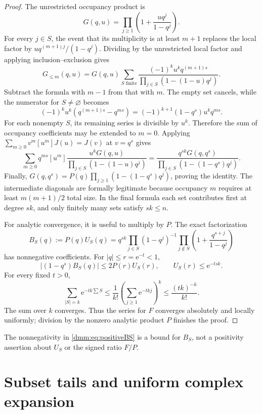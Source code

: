 \documentclass[11pt,letterpaper]{article}
\numberwithin{equation}{section}
\theoremstyle{definition}\newtheorem{definition}[theorem]{Definition}
\theoremstyle{remark}\newtheorem{remark}[theorem]{Remark}
\newcommand{\ee}{\mathrm e}
\begin{document}
\begin{proof}
The unrestricted occupancy product is
\[
G(q,u)=\prod_{j\ge1}\left(1+\frac{u q^j}{1-q^j}\right).
\]
For every $j\in S$, the event that its multiplicity is at least $m+1$ replaces the local factor by $u q^{(m+1)j}/(1-q^j)$. Dividing by the unrestricted local factor and applying inclusion--exclusion gives
\begin{equation}\label{dmm:eq:IE}
G_{\le m}(q,u)=G(q,u)
\sum_{S\text{ finite}}
\frac{(-1)^k u^kq^{(m+1)s}}
{\prod_{j\in S}(1-(1-u)q^j)}.
\end{equation}
Subtract the formula with $m-1$ from that with $m$. The empty set cancels, while the numerator for $S\ne\varnothing$ becomes
\[
(-1)^ku^k(q^{(m+1)s}-q^{ms})
=(-1)^{k+1}(1-q^s)u^kq^{ms}.
\]
For each nonempty $S$, its remaining series is divisible by $u^k$. Therefore the sum of occupancy coefficients may be extended to $m=0$. Applying
$\sum_{m\ge0}v^m[u^m]J(u)=J(v)$ at $v=q^s$ gives
\[
\sum_{m\ge0}q^{ms}[u^m]
\frac{u^kG(q,u)}{\prod_{j\in S}(1-(1-u)q^j)}
=\frac{q^{sk}G(q,q^s)}{\prod_{j\in S}(1-(1-q^s)q^j)}.
\]
Finally,
$G(q,q^s)=P(q)\prod_{j\ge1}(1-(1-q^s)q^j)$, proving the identity.
The intermediate diagonals are formally legitimate because occupancy $m$ requires at least $m(m+1)/2$ total size. In the final formula each set contributes first at degree $sk$, and only finitely many sets satisfy $sk\le n$.

For analytic convergence, it is useful to multiply by $P$. The exact factorization
\begin{equation}\label{dmm:eq:positiveBS}
B_S(q):=P(q)U_S(q)
=q^{sk}\prod_{j\in S}(1-q^j)^{-1}
\prod_{j\notin S}\left(1+\frac{q^{s+j}}{1-q^j}\right)
\end{equation}
has nonnegative coefficients. For $|q|\le r=\ee^{-t}<1$,
\[
|(1-q^s)B_S(q)|\le2P(r)U_S(r),\qquad
U_S(r)\le\ee^{-tsk}.
\]
For every fixed $t>0$,
\begin{equation}\label{dmm:eq:symmetric}
\sum_{|S|=k}\ee^{-tk\sum S}
\le\frac1{k!}\left(\sum_{j\ge1}\ee^{-tkj}\right)^k
\le\frac{(tk)^{-k}}{k!}.
\end{equation}
The sum over $k$ converges. Thus the series for $F$ converges absolutely and locally uniformly; division by the nonzero analytic product $P$ finishes the proof.
\end{proof}
The nonnegativity in \eqref{dmm:eq:positiveBS} is a bound for $B_S$, not a positivity assertion about $U_S$ or the signed ratio $F/P$.

\section{Subset tails and uniform complex expansion}\label{dmm:sec:local}
\end{document}
